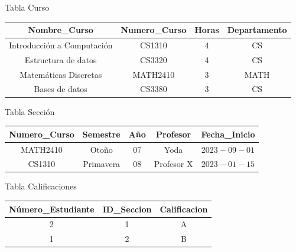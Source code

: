 \documentclass[a4paper,12pt]{article}
\begin{document}
\begin{enumerate}
    \vspace{10mm}
  
    \begin{minipage}[c]{0.75\textwidth}        
      Tabla Curso  \\
  
        \begin{tabular}{|c|c|c|c|}
          \hline
            Nombre\_Curso & Numero\_Curso & Horas & Departamento \\
          \hline
            Introducción a Computación & CS1310 & 4 & CS \\
            Estructura de datos & CS3320 & 4 & CS \\
            Matemáticas Discretas & MATH2410 & 3 & MATH \\
            Bases de datos & CS3380 & 3 & CS \\
          \hline
        \end{tabular}
    \end{minipage}
  
    \vspace{10mm}
  
    \begin{minipage}[c]{0.75\textwidth}        
      Tabla Sección \\
  
        \begin{tabular}{|c|c|c|c|c|}
        \hline
          Numero\_Curso & Semestre & Año & Profesor & Fecha\_Inicio \\ \hline
          MATH2410 & Otoño & 07 & Yoda & $2023-09-01$ \\
          CS1310 & Primavera & 08 & Profesor X & $2023-01-15$ \\
        \hline
        \end{tabular}
    \end{minipage}
  
    \vspace{10mm}
  
    \begin{minipage}[c]{0.75\textwidth}        
        Tabla Calificaciones \\
  
        \begin{tabular}{|c|c|c|}
        \hline
          Número\_Estudiante & ID\_Seccion & Calificacion \\ \hline
          2 & 1 & A \\
          1 & 2 & B \\
        \hline
        \end{tabular}
    \end{minipage}
  

\end{enumerate}
\end{document}
